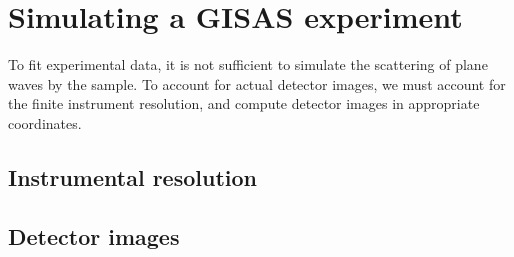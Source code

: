 
\chapter{Simulating a GISAS experiment}  \label{sec:Exp}

To fit experimental data, it is not sufficient to simulate
the scattering of plane waves by the sample.
To account for actual detector images,
we must account for the finite instrument resolution,
and compute detector images in appropriate coordinates.

\section{Instrumental resolution}\label{Sresolution}

\MissingSection
\section{Detector images}\label{Sdetimg}



\MissingSection

